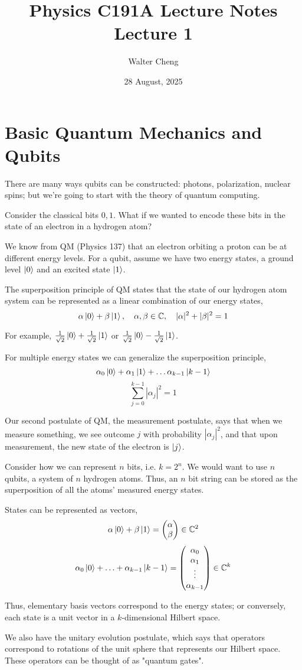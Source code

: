 \documentclass[11pt]{article}
\title{Physics C191A Lecture Notes\\ Lecture 1}
\date{28 August, 2025}
\author{Walter Cheng}
\begin{document}
\maketitle

\section{Basic Quantum Mechanics and Qubits}

There are many ways qubits can be constructed: photons, polarization, nuclear spins; but we're going to start with the theory of quantum computing.

Consider the classical bits $0, 1$. What if we wanted to encode these bits in the state of an electron in a hydrogen atom?

We know from QM (Physics 137) that an electron orbiting a proton can be at different energy levels. For a qubit, assume we have two energy states, a ground level $\ket{0}$ and an excited state $\ket{1}$. 

The superposition principle of QM states that the state of our hydrogen atom system can be represented as a linear combination of our energy states,
\[\alpha\ket{0} + \beta\ket{1}, \quad \alpha, \beta \in \mathbb{C}, \quad |\alpha|^2 + |\beta|^2 = 1\]

For example, $\frac{1}{\sqrt{2}}\ket{0} + \frac{1}{\sqrt{2}}\ket{1}$ or $\frac{1}{\sqrt{2}}\ket{0} - \frac{1}{\sqrt{2}}\ket{1}$.

For multiple energy states we can generalize the superposition principle,
\[\alpha_0\ket{0} + \alpha_1 \ket{1} + \ldots \alpha_{k-1} \ket{k-1}\]
\[\sum_{j=0}^{k-1} |\alpha_j|^2 = 1\]

Our second postulate of QM, the measurement postulate, says that when we measure something, we see outcome $j$ with probability $|\alpha_j|^2$, and that upon measurement, the new state of the electron is $\ket{j}$.

Consider how we can represent $n$ bits, i.e. $k = 2^n$. We would want to use $n$ qubits, a system of $n$ hydrogen atoms. Thus, an $n$ bit string can be stored as the superposition of all the atoms' measured energy states.

States can be represented as vectors,
\[\alpha\ket{0} + \beta\ket{1} = \begin{pmatrix}\alpha \\ \beta \end{pmatrix} \in \mathbb{C}^2\]
\[\alpha_0\ket{0} + \ldots + \alpha_{k-1}\ket{k-1} = \begin{pmatrix} \alpha_0 \\ \alpha_ 1 \\ \vdots \\ \alpha_{k-1} \end{pmatrix} \in \mathbb{C}^k\]

Thus, elementary basis vectors correspond to the energy states; or conversely, each state is a unit vector in a $k$-dimensional Hilbert space.

We also have the unitary evolution postulate, which says that operators correspond to rotations of the unit sphere that represents our Hilbert space. These operators can be thought of as "quantum gates".
\end{document}
